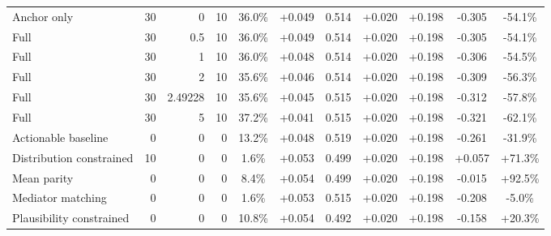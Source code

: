 \begin{table}[htbp]
\begin{tabular}{lrrrccccccc}
Anchor only & 30 & 0 & 10 & 36.0\% & +0.049 & 0.514 & +0.020 & +0.198 & -0.305 & -54.1\% \\
Full & 30 & 0.5 & 10 & 36.0\% & +0.049 & 0.514 & +0.020 & +0.198 & -0.305 & -54.1\% \\
Full & 30 & 1 & 10 & 36.0\% & +0.048 & 0.514 & +0.020 & +0.198 & -0.306 & -54.5\% \\
Full & 30 & 2 & 10 & 35.6\% & +0.046 & 0.514 & +0.020 & +0.198 & -0.309 & -56.3\% \\
Full & 30 & 2.49228 & 10 & 35.6\% & +0.045 & 0.515 & +0.020 & +0.198 & -0.312 & -57.8\% \\
Full & 30 & 5 & 10 & 37.2\% & +0.041 & 0.515 & +0.020 & +0.198 & -0.321 & -62.1\% \\
Actionable baseline & 0 & 0 & 0 & 13.2\% & +0.048 & 0.519 & +0.020 & +0.198 & -0.261 & -31.9\% \\
Distribution constrained & 10 & 0 & 0 & 1.6\% & +0.053 & 0.499 & +0.020 & +0.198 & +0.057 & +71.3\% \\
Mean parity & 0 & 0 & 0 & 8.4\% & +0.054 & 0.499 & +0.020 & +0.198 & -0.015 & +92.5\% \\
Mediator matching & 0 & 0 & 0 & 1.6\% & +0.053 & 0.515 & +0.020 & +0.198 & -0.208 & -5.0\% \\
Plausibility constrained & 0 & 0 & 0 & 10.8\% & +0.054 & 0.492 & +0.020 & +0.198 & -0.158 & +20.3\% \\
\bottomrule
\end{tabular}
\end{table}